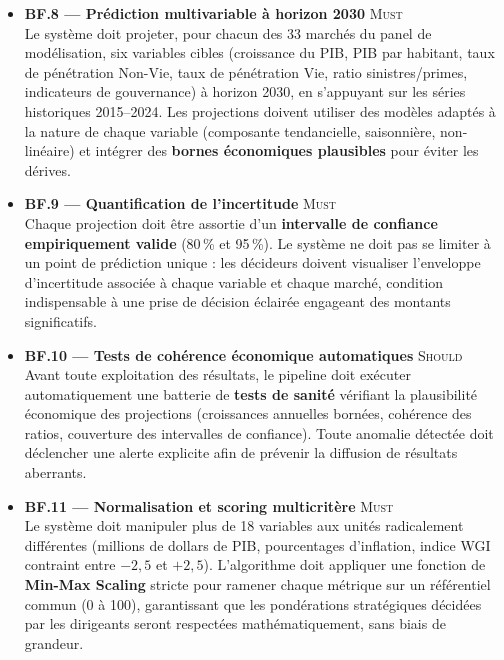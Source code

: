 \documentclass[12pt,a4paper]{report}
\begin{document}
\begin{itemize}[leftmargin=1.5cm, itemsep=5pt]
  \item \textbf{BF.8 --- Prédiction multivariable à horizon 2030} \hfill \textsc{Must} \\ Le système doit projeter, pour chacun des 33 marchés du panel de modélisation, six variables cibles (croissance du PIB, PIB par habitant, taux de pénétration Non-Vie, taux de pénétration Vie, ratio sinistres/primes, indicateurs de gouvernance) à horizon 2030, en s'appuyant sur les séries historiques 2015--2024. Les projections doivent utiliser des modèles adaptés à la nature de chaque variable (composante tendancielle, saisonnière, non-linéaire) et intégrer des \textbf{bornes économiques plausibles} pour éviter les dérives.

  \item \textbf{BF.9 --- Quantification de l'incertitude} \hfill \textsc{Must} \\ Chaque projection doit être assortie d'un \textbf{intervalle de confiance empiriquement valide} (80\,\% et 95\,\%). Le système ne doit pas se limiter à un point de prédiction unique : les décideurs doivent visualiser l'enveloppe d'incertitude associée à chaque variable et chaque marché, condition indispensable à une prise de décision éclairée engageant des montants significatifs.

  \item \textbf{BF.10 --- Tests de cohérence économique automatiques} \hfill \textsc{Should} \\ Avant toute exploitation des résultats, le pipeline doit exécuter automatiquement une batterie de \textbf{tests de sanité} vérifiant la plausibilité économique des projections (croissances annuelles bornées, cohérence des ratios, couverture des intervalles de confiance). Toute anomalie détectée doit déclencher une alerte explicite afin de prévenir la diffusion de résultats aberrants.

  \item \textbf{BF.11 --- Normalisation et scoring multicritère} \hfill \textsc{Must} \\ Le système doit manipuler plus de 18 variables aux unités radicalement différentes (millions de dollars de PIB, pourcentages d'inflation, indice WGI contraint entre $-2{,}5$ et $+2{,}5$). L'algorithme doit appliquer une fonction de \textbf{Min-Max Scaling} stricte pour ramener chaque métrique sur un référentiel commun (0 à 100), garantissant que les pondérations stratégiques décidées par les dirigeants seront respectées mathématiquement, sans biais de grandeur.


\end{itemize}
\end{document}
